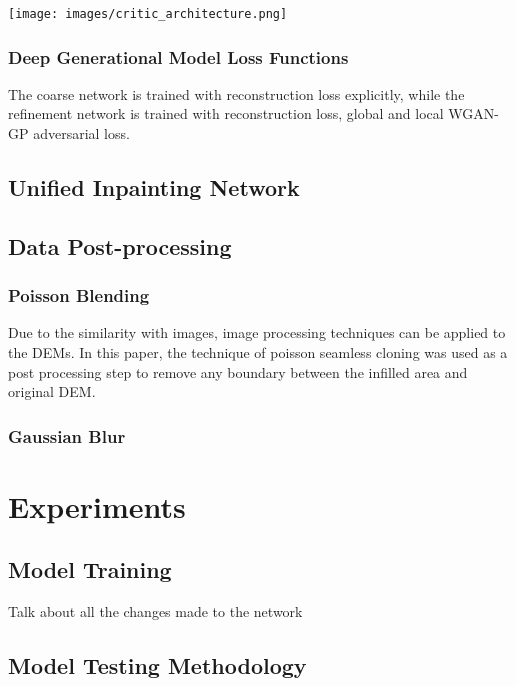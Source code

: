 \documentclass[twocolumn]{article}
\begin{document}
\begin{figure*}
\centering
\texttt{[image: images/critic\_architecture.png]}
\end{figure*}

\subsubsection{Deep Generational Model Loss Functions}
\label{sec:orgd70f46f}
The coarse network is trained with reconstruction loss explicitly, while the refinement network is trained with reconstruction loss, global and local WGAN-GP adversarial loss.\autocite{yuGenerativeImageInpainting2018}
\subsection{Unified Inpainting Network}
\label{sec:org25d09b4}
\subsection{Data Post-processing}
\label{sec:orgf9b8a1d}
\subsubsection{Poisson Blending}
\label{sec:org022432b}
Due to the similarity with images, image processing techniques can be applied to the DEMs.
In this paper, the technique of poisson seamless cloning\autocite{perezPoissonImageEditing2003} was used as a post processing step to remove any boundary between the infilled area and original DEM.

\subsubsection{Gaussian Blur}
\label{sec:org1d6b296}


\section{Experiments}
\label{sec:orga555902}
\subsection{Model Training}
\label{sec:org5b7d34d}
Talk about all the changes made to the network
\subsection{Model Testing Methodology}
\label{sec:orgb9bddff}
\end{document}
